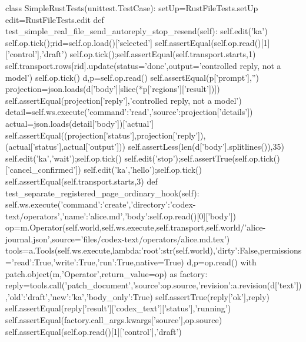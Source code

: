 class SimpleRustTests(unittest.TestCase):
 setUp=RustFileTests.setUp
 edit=RustFileTests.edit
 def test_simple_real_file_send_autoreply_stop_resend(self):
  self.edit('ka')
  self.op.tick();rid=self.op.load()['selected']
  self.assertEqual(self.op.read()[1]['control'],'draft')
  self.op.tick();self.assertEqual(self.transport.starts,1)
  self.transport.rows[rid].update(status='done',output='controlled reply, not a model')
  self.op.tick()
  d,p=self.op.read()
  self.assertEqual(p['prompt'],'')
  projection=json.loads(d['body'][slice(*p['regions']['result'])])
  self.assertEqual(projection['reply'],'controlled reply, not a model')
  detail=self.ws.execute({'command':'read','source':projection['details']})
  actual=json.loads(detail['body'])['actual']
  self.assertEqual((projection['status'],projection['reply']),(actual['status'],actual['output']))
  self.assertLess(len(d['body'].splitlines()),35)
  self.edit('ka','wait');self.op.tick()
  self.edit('stop');self.assertTrue(self.op.tick()['cancel_confirmed'])
  self.edit('ka','hello');self.op.tick()
  self.assertEqual(self.transport.starts,3)
 def test_separate_registered_page_ordinary_hook(self):
  self.ws.execute({'command':'create','directory':'codex-text/operators','name':'alice.md','body':self.op.read()[0]['body']})
  op=m.Operator(self.world,self.ws.execute,self.transport,self.world/'alice-journal.json',source='files/codex-text/operators/alice.md.tex')
  tools=a.Tools(self.ws.execute,lambda:{'root':str(self.world),'dirty':False},permissions={'read':True,'write':True,'run':True},native=True)
  d,p=op.read()
  with patch.object(m,'Operator',return_value=op) as factory:
   reply=tools.call('patch_document',{'source':op.source,'revision':a.revision(d['text']),'old':'draft','new':'ka','body_only':True})
  self.assertTrue(reply['ok'],reply)
  self.assertEqual(reply['result']['codex_text']['status'],'running')
  self.assertEqual(factory.call_args.kwargs['source'],op.source)
  self.assertEqual(self.op.read()[1]['control'],'draft')


